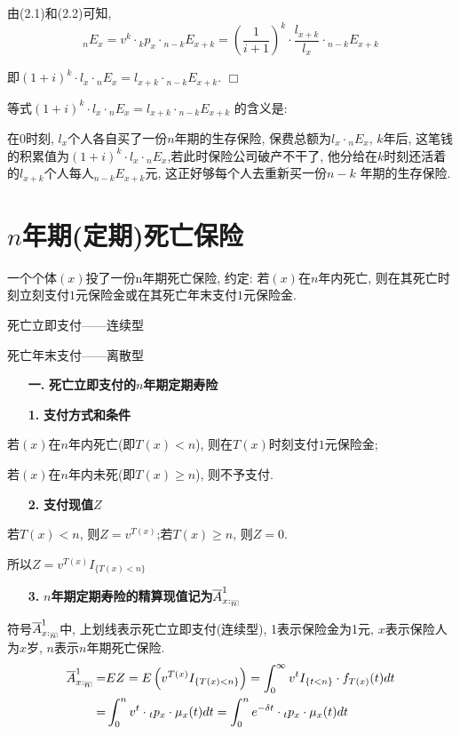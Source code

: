 \documentclass[a4paper,10pt]{ctexbook}
\makeatletter
\newcommand{\hei}{\CJKfamily{hei}}      %
\def\qed{\hfill$\Box$\medskip}
\DeclareRobustCommand{\annu}[1]{_{%
    \def\arraystretch{0}%
    \setlength\arraycolsep{1pt}%
    \setlength\arrayrulewidth{.2pt}%
    \begin{array}[b]{@{}c|}\hline
        \\[\arraycolsep]%
        \scriptstyle #1%
    \end{array}%
}}
\makeatother
\begin{document}
由(2.1)和(2.2)可知,
$$_nE_x=v^k\cdot {}_kp_x\cdot {}_{n-k}E_{x+k}=(\frac{1}{i+1})^k\cdot\frac{l_{x+k}}{l_x}\cdot {}_{n-k}E_{x+k}$$

即$(1+i)^k\cdot l_x\cdot {}_nE_x=l_{x+k}\cdot {}_{n-k}E_{x+k}$.
\qed


\begin{remark}
    等式$(1+i)^k\cdot l_x\cdot {}_nE_x=l_{x+k}\cdot {}_{n-k}E_{x+k}$ 的含义是:

    在$0$时刻, $l_x$个人各自买了一份$n$年期的生存保险, 保费总额为$l_x\cdot {}_nE_x$, $k$年后, 这笔钱的积累值为$(1+i)^k\cdot l_x\cdot {}_nE_x$,若此时保险公司破产不干了, 他分给在$k$时刻还活着的$l_{x+k}$个人每人$_{n-k}E_{x+k}$元, 这正好够每个人去重新买一份$n-k$ 年期的生存保险.
\end{remark}
\section{$n$年期(定期)死亡保险}

一个个体$(x)$投了一份n年期死亡保险, 约定: 若$(x)$在$n$年内死亡, 则在其死亡时刻立刻支付$1$元保险金或在其死亡年末支付$1$元保险金.

死亡立即支付——连续型

死亡年末支付——离散型
\begin{itemize}
    \item[{\bf\hei 一.}]{\bf\hei 死亡立即支付的$n$年期定期寿险}
\end{itemize}
\begin{itemize}
    \item[{\bf\hei 1.}]{\bf\hei 支付方式和条件}
\end{itemize}

若$(x)$在$n$年内死亡(即$T(x)<n$), 则在$T(x)$时刻支付$1$元保险金;

若$(x)$在$n$年内未死(即$T(x)\geqslant n$), 则不予支付.
\begin{itemize}
    \item[{\bf\hei 2.}]{\bf\hei 支付现值$Z$}
\end{itemize}

若$T(x)<n$, 则$Z=v^{T(x)}$;若$T(x)\geqslant n$, 则$Z=0$.

所以$Z=v^{T(x)}I_{\{T(x)<n\}}$
\begin{itemize}
    \item[{\bf\hei 3.}]{\bf\hei $n$年期定期寿险的精算现值记为$\overline{A}_{x:\annu{n}}^1$}
\end{itemize}
\begin{remark}
    符号$\overline{A}_{x:\annu{n}}^1$中, 上划线表示死亡立即支付(连续型), 1表示保险金为1元, $x$表示保险人为$x$岁, $n$表示$n$年期死亡保险.
    \begin{align*}
        \overline{A}_{x:\annu{n}}^1= & EZ=E\left( v^{T\left( x \right)}I_{\left\{ T\left( x \right) <n \right\}} \right) =\int_0^{\infty}{v^{t}I_{\left\{ t <n \right\}}\cdot f_{T(x)}(t)dt} \\
        =                            & \int_0^{n}{v^{t}\cdot {}_tp_x\cdot \mu_{x}(t)dt}=\int_0^{n}{e^{-\delta t}\cdot {}_tp_x\cdot \mu_{x}(t)dt}
    \end{align*}
\end{remark}
\end{document}
